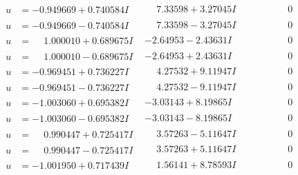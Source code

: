 \documentclass[1p]{elsarticle_modified}
\theoremstyle{definition}
\begin{document}
$$\begin{array}{c|c|c}
\begin{aligned}
u &= -0.949669 + 0.740584 I\end{aligned}
 & \phantom{-}7.33598 + 3.27045 I & \phantom{-0.000000 } 0 \\ \hline\begin{aligned}
u &= -0.949669 - 0.740584 I\end{aligned}
 & \phantom{-}7.33598 - 3.27045 I & \phantom{-0.000000 } 0 \\ \hline\begin{aligned}
u &= \phantom{-}1.000010 + 0.689675 I\end{aligned}
 & -2.64953 - 2.43631 I & \phantom{-0.000000 } 0 \\ \hline\begin{aligned}
u &= \phantom{-}1.000010 - 0.689675 I\end{aligned}
 & -2.64953 + 2.43631 I & \phantom{-0.000000 } 0 \\ \hline\begin{aligned}
u &= -0.969451 + 0.736227 I\end{aligned}
 & \phantom{-}4.27532 + 9.11947 I & \phantom{-0.000000 } 0 \\ \hline\begin{aligned}
u &= -0.969451 - 0.736227 I\end{aligned}
 & \phantom{-}4.27532 - 9.11947 I & \phantom{-0.000000 } 0 \\ \hline\begin{aligned}
u &= -1.003060 + 0.695382 I\end{aligned}
 & -3.03143 + 8.19865 I & \phantom{-0.000000 } 0 \\ \hline\begin{aligned}
u &= -1.003060 - 0.695382 I\end{aligned}
 & -3.03143 - 8.19865 I & \phantom{-0.000000 } 0 \\ \hline\begin{aligned}
u &= \phantom{-}0.990447 + 0.725417 I\end{aligned}
 & \phantom{-}3.57263 - 5.11647 I & \phantom{-0.000000 } 0 \\ \hline\begin{aligned}
u &= \phantom{-}0.990447 - 0.725417 I\end{aligned}
 & \phantom{-}3.57263 + 5.11647 I & \phantom{-0.000000 } 0 \\ \hline\begin{aligned}
u &= -1.001950 + 0.717439 I\end{aligned}
 & \phantom{-}1.56141 + 8.78593 I & \phantom{-0.000000 } 0 \\ \hline\begin{aligned}

\end{aligned}
\end{array}$$
\end{document}
